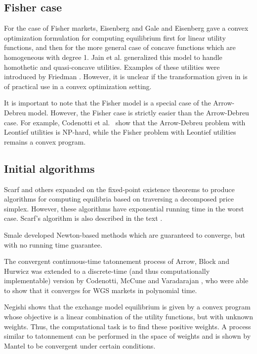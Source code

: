 \documentclass{article}
\begin{document}
\subsection{Fisher case}
For the case of Fisher markets,
Eisenberg and Gale \cite{eisenberg1959consensus, gale1960theory} and
Eisenberg \cite{eisenberg1961aggregation} gave a convex optimization formulation for computing equilibrium first for linear utility functions, and then for the more general case of concave functions which are homogeneous with degree 1.
Jain et al. \cite{jain2005market} generalized this model to handle homothetic and quasi-concave utilities.
Examples of these utilities were introduced by Friedman
\cite{friedman1973concavity}.
However, it is unclear if the transformation given in \cite{jain2005market} is of practical use in a convex optimization setting.

It is important to note that the Fisher model is a special case of the Arrow-Debreu model. However, the Fisher case is strictly easier than the Arrow-Debreu case. For example, Codenotti et al.\ \cite{codenotti2006leontief} show that the Arrow-Debreu problem with Leontief utilities is NP-hard, while the Fisher problem with Leontief utilities remains a convex program.

\subsection{Initial algorithms}

Scarf and others \cite{scarf2008applied,eaves1972homotopies,kuhn1968simplicial}
expanded on the fixed-point existence theorems to produce algorithms for computing equilibria based on traversing a decomposed price simplex. However, these algorithms have exponential running time in the worst case. Scarf's algorithm is also described in the text \cite{shoven1992applying}.

Smale \cite{smale1976convergent, smale1976exchange} developed Newton-based methods which are guaranteed to converge, but with no running time guarantee.

The convergent continuous-time tatonnement process of Arrow, Block and Hurwicz \cite{arrow1959stability} was extended to a discrete-time (and thus computationally implementable) version by Codenotti, McCune and Varadarajan \cite{codenotti2005marketExcess}, who were able to show that it converges for WGS markets in polynomial time.

Negishi \cite{negishi1960welfare} shows that the exchange model equilibrium is given by a convex program whose objective is a linear combination of the utility functions, but with unknown weights. Thus, the computational task is to find these positive weights. A process similar to tatonnement can be performed in the space of weights and is shown by Mantel \cite{mantel1971welfare} to be convergent under certain conditions.
\end{document}
